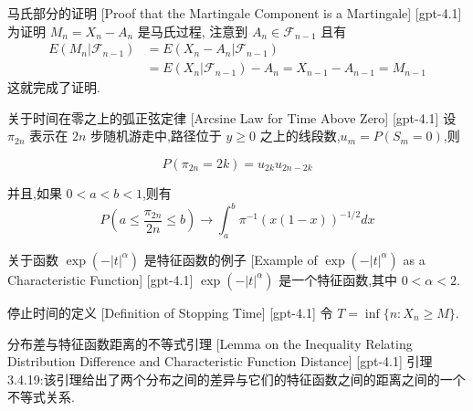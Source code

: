 \documentclass[UTF8]{ctexart}
\begin{document}
    \begin{prf}
        {马氏部分的证明}
        [Proof that the Martingale Component is a Martingale]
        [gpt-4.1]
        为证明 $M_n = X_n - A_n$ 是马氏过程, 注意到 $A_n \in \mathcal{F}_{n-1}$ 且有
\[
\begin{array}{rl}
E(M_n | \mathcal{F}_{n-1}) &= E(X_n - A_n | \mathcal{F}_{n-1}) \\
&= E(X_n | \mathcal{F}_{n-1}) - A_n = X_{n-1} - A_{n-1} = M_{n-1}
\end{array}
\]
这就完成了证明.

    \end{prf}
    
    
    
    \begin{thm}
        {关于时间在零之上的弧正弦定律}
        [Arcsine Law for Time Above Zero]
        [gpt-4.1]
        设 $\pi_{2n}$ 表示在 $2n$ 步随机游走中,路径位于 $y \geq 0$ 之上的线段数,$u_m = P(S_m = 0)$,则

\[
P(\pi_{2n} = 2k) = u_{2k} u_{2n-2k}
\]

并且,如果 $0 < a < b < 1$,则有
\[
P\left(a \leq \frac{\pi_{2n}}{2n} \leq b\right) \to \int_{a}^{b} \pi^{-1} (x(1-x))^{-1/2} dx
\]

    \end{thm}
    
    
    
    \begin{xmp}
        {关于函数 $\exp ( - | t | ^ { \alpha } )$ 是特征函数的例子}
        [Example of $\exp ( - | t | ^ { \alpha } )$ as a Characteristic Function]
        [gpt-4.1]
        $\exp ( - | t | ^ { \alpha } )$ 是一个特征函数,其中 $0 < \alpha < 2$.
    \end{xmp}
    
    
    
    \begin{dfn}
        {停止时间的定义}
        [Definition of Stopping Time]
        [gpt-4.1]
        令 $T = \operatorname*{inf} \{ n : X _ { n } \geq M \}$.
    \end{dfn}
    
    
    
    \begin{lma}
        {分布差与特征函数距离的不等式引理}
        [Lemma on the Inequality Relating Distribution Difference and Characteristic Function Distance]
        [gpt-4.1]
        引理 3.4.19:该引理给出了两个分布之间的差异与它们的特征函数之间的距离之间的一个不等式关系.
    \end{lma}
    
\end{document}
